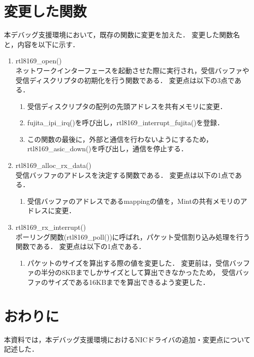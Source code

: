 \documentclass[12pt]{jsarticle}
\begin{document}
\section{変更した関数}
本デバッグ支援環境において，既存の関数に変更を加えた．
変更した関数名と，内容を以下に示す．
\begin{enumerate}
    \item rtl8169\_open()\\
        ネットワークインターフェースを起動させた際に実行され，受信バッファや受信ディスクリプタの初期化を行う関数である．
        変更点は以下の3点である．
        \begin{enumerate}
            \item 受信ディスクリプタの配列の先頭アドレスを共有メモリに変更．
            \item fujita\_ipi\_irq()を呼び出し，rtl8169\_interrupt\_fujita()を登録．
            \item この関数の最後に，外部と通信を行わないようにするため，rtl8169\_asic\_down()を呼び出し，通信を停止する．
        \end{enumerate}
    \item rtl8169\_alloc\_rx\_data()\\
        受信バッファのアドレスを決定する関数である．
        変更点は以下の1点である．
        \begin{enumerate}
            \item 受信バッファのアドレスであるmappingの値を，Mintの共有メモリのアドレスに変更．
        \end{enumerate}
    \item rtl8169\_rx\_interrupt()\\
        ポーリング関数(rtl8169\_poll())に呼ばれ，パケット受信割り込み処理を行う関数である．
        変更点は以下の1点である．
        \begin{enumerate}
            \item パケットのサイズを算出する際の値を変更した．
                変更前は，受信バッファの半分の8KBまでしかサイズとして算出できなかったため，
                受信バッファのサイズである16KBまでを算出できるよう変更した．
        \end{enumerate}
\end{enumerate}
\section{おわりに}
本資料では，本デバッグ支援環境におけるNICドライバの追加・変更点について記述した．
\end{document}
